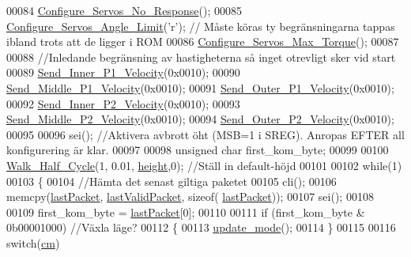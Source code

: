 \begin{DoxyCode}
00084     \hyperlink{servo___u_a_r_t_8c_a17e89f3d8b4abe3abe352ffba8b684f1}{Configure\_Servos\_No\_Response}();
00085     \hyperlink{servo___u_a_r_t_8c_ac61953255036321acac8c2e20b76d692}{Configure\_Servos\_Angle\_Limit}(\textcolor{charliteral}{'r'}); \textcolor{comment}{// Måste köras ty begränsningarna tappas
       ibland trots att de ligger i ROM}
00086     \hyperlink{servo___u_a_r_t_8c_a2f788735cafd686c547c9340d905c3ad}{Configure\_Servos\_Max\_Torque}();
00087     
00088     \textcolor{comment}{//Inledande begränsning av hastigheterna så inget otrevligt sker vid start}
00089     \hyperlink{servo___u_a_r_t_8c_ace1792c5f066181d607cb075a87f3178}{Send\_Inner\_P1\_Velocity}(0x0010);
00090     \hyperlink{servo___u_a_r_t_8c_a63e528b1a0c31e9912ebbceee58a5faa}{Send\_Middle\_P1\_Velocity}(0x0010);
00091     \hyperlink{servo___u_a_r_t_8c_a30fbb081db7418d454bfe8761ca59dd2}{Send\_Outer\_P1\_Velocity}(0x0010);
00092     \hyperlink{servo___u_a_r_t_8c_a9cb7e763d9a3501fc345a424d67975a7}{Send\_Inner\_P2\_Velocity}(0x0010);
00093     \hyperlink{servo___u_a_r_t_8c_aae94fcd8998679345fa7d70648bd2a1e}{Send\_Middle\_P2\_Velocity}(0x0010);
00094     \hyperlink{servo___u_a_r_t_8c_a6c4f4c2915df647ac40c86c17e613e30}{Send\_Outer\_P2\_Velocity}(0x0010);
00095 
00096     sei(); \textcolor{comment}{//Aktivera avbrott öht (MSB=1 i SREG). Anropas EFTER all konfigurering är klar.}
00097 
00098     \textcolor{keywordtype}{unsigned} \textcolor{keywordtype}{char} first\_kom\_byte;
00099     
00100     \hyperlink{gangstilar_8c_a8b22e9229a15d20adb676428ad7f6dac}{Walk\_Half\_Cycle}(1, 0.01, \hyperlink{styr_2styr_2main_8c_a48083b65ac9a863566dc3e3fff09a5b4}{height},0); \textcolor{comment}{//Ställ in default-höjd}
00101 
00102     \textcolor{keywordflow}{while}(1)
00103     \{
00104         \textcolor{comment}{//Hämta det senast giltiga paketet}
00105         cli();
00106         memcpy(\hyperlink{styr_2styr_2main_8c_a17b197a501fde4cc8d5475b4adaab464}{lastPacket}, \hyperlink{_s_p_i_8h_ab15ab508531e452eb0768f69f7c588da}{lastValidPacket}, \textcolor{keyword}{sizeof}(
      \hyperlink{styr_2styr_2main_8c_a17b197a501fde4cc8d5475b4adaab464}{lastPacket}));
00107         sei();
00108         
00109         first\_kom\_byte = \hyperlink{styr_2styr_2main_8c_a17b197a501fde4cc8d5475b4adaab464}{lastPacket}[0];
00110         
00111         \textcolor{keywordflow}{if} (first\_kom\_byte & 0b00001000) \textcolor{comment}{//Växla läge?}
00112         \{
00113             \hyperlink{styr_2styr_2main_8c_aef200cbcdfce82fec3d5662a556ca3a1}{update\_mode}();
00114         \}
00115         
00116         \textcolor{keywordflow}{switch}(\hyperlink{styr_2styr_2main_8c_a33f2231ad0dc535a3976677c8de97a8d}{cm})

\end{DoxyCode}
